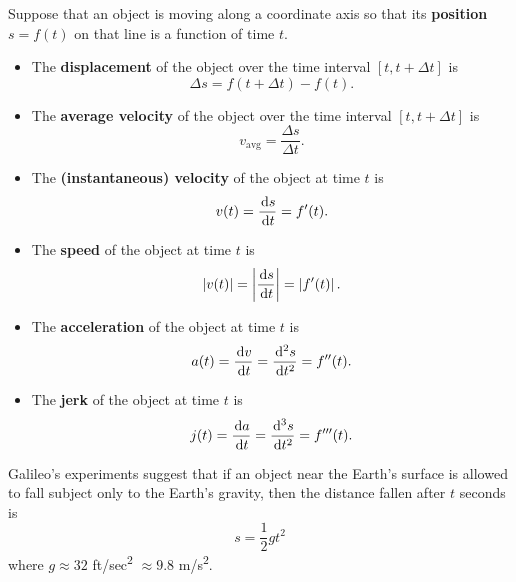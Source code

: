 \begin{definition}
Suppose that an object is moving along a coordinate axis so that its \textbf{position} $s=f(t)$ on that line is a function of time $t$.
\begin{itemize}
\item The \textbf{displacement} of the object over the time interval $[t, t+\Delta t]$ is
\begin{equation*}
\Delta s = f(t+\Delta t) - f(t).
\end{equation*}
\item The \textbf{average velocity} of the object over the time interval $[t, t+\Delta t]$ is
\begin{equation*}
v_{\mathrm{avg}} = \frac{\Delta s}{\Delta t}.
\end{equation*}
\item The \textbf{(instantaneous) velocity} of the object at time $t$ is
\begin{equation*}
v(t) = \frac{\mkern 2mu \mathrm{d} s}{\mkern 2mu \mathrm{d} t} = f'(t).
\end{equation*}
\item The \textbf{speed} of the object at time $t$ is
\begin{equation*}
|v(t)| = \left|\frac{\mkern 2mu \mathrm{d} s}{\mkern 2mu \mathrm{d} t}\right| = \left|f'(t)\right|.
\end{equation*}
\item The \textbf{acceleration} of the object at time $t$ is
\begin{equation*}
a(t) = \frac{\mkern 2mu \mathrm{d} v}{\mkern 2mu \mathrm{d} t} = \frac{\mkern 2mu \mathrm{d}^2 s}{\mkern 2mu \mathrm{d} t^2} = f''(t).
\end{equation*}
\item The \textbf{jerk} of the object at time $t$ is
\begin{equation*}
j(t) = \frac{\mkern 2mu \mathrm{d} a}{\mkern 2mu \mathrm{d} t} = \frac{\mkern 2mu \mathrm{d}^3 s}{\mkern 2mu \mathrm{d} t^2} = f'''(t).
\end{equation*}
\end{itemize}
\end{definition}

\newpage

\begin{remark}
Galileo's experiments suggest that if an object near the Earth's surface is allowed to fall subject only to the Earth's gravity, then the distance fallen after $t$ seconds is
\begin{equation*}
s = \frac{1}{2}g t^2
\end{equation*}
where $g \approx 32$ \si{ft/sec^2} $\approx 9.8$ \si{m/s^2}.
\end{remark}

